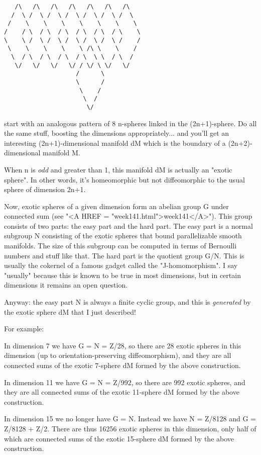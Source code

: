 \begin{verbatim}
   /\   /\   /\   /\   /\   /\   /\ 
  /  \ /  \ /  \ /  \ /  \ /  \ /  \
 /    \    \    \    \    \    \    \
/    / \  / \  / \  / \  / \  / \    \ 
\    \ /  \ /  \ /  \ /  \ /  \ /    / 
 \    \    \    \    \ /\ \    \    /
  \  / \  / \  / \  / \  \ \  / \  /
   \/   \/   \/   \/ / \/ \ \/   \/
                    /      \ 
                    \      /
                     \    /
                      \  /
                       \/ 
\end{verbatim}
    
start with an analogous pattern of 8 n-spheres linked in the (2n+1)-sphere.
Do all the same stuff, boosting the dimensions appropriately... and you'll
get an interesting (2n+1)-dimensional manifold dM which is the boundary of 
a (2n+2)-dimensional manifold M.  

When n is \emph{odd} and greater than 1, this manifold dM is actually an
"exotic sphere".  In other words, it's homeomorphic but not
diffeomorphic to the usual sphere of dimension 2n+1.

Now, exotic spheres of a given dimension form an abelian group G under
connected sum (see "<A HREF = "week141.html">week141</A>").
This group consists of two parts: the easy part and the hard part.  The
easy part is a normal subgroup N consisting of the exotic spheres that
bound parallelizable smooth manifolds.  The size of this subgroup can be
computed in terms of Bernoulli numbers and stuff like that.  The hard
part is the quotient group G/N.  This is usually the cokernel of a
famous gadget called the "J-homomorphism".  I say
"usually" because this is known to be true in most dimensions,
but in certain dimensions it remains an open question.

Anyway: the easy part N is always a finite cyclic group, and this is
\emph{generated} by the exotic sphere dM that I just described!   

For example: 

In dimension 7 we have G = N = Z/28, so there are 28 exotic spheres in
this dimension (up to orientation-preserving diffeomorphism), and they 
are all connected sums of the exotic 7-sphere dM formed by the above 
construction.   

In dimension 11 we have G = N = Z/992, so there are 992 exotic spheres,
and they are all connected sums of the exotic 11-sphere dM formed by the 
above construction.

In dimension 15 we no longer have G = N.  Instead we have N = Z/8128
and G = Z/8128 + Z/2.  There are thus 16256 exotic spheres in this
dimension, only half of which are connected sums of the exotic 15-sphere 
dM formed by the above construction.

